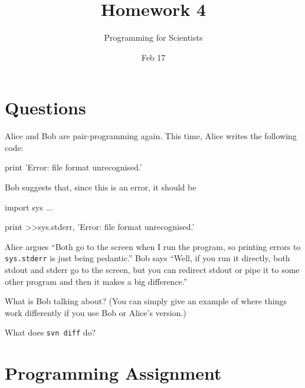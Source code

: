 
\author{Programming for Scientists}
\title{Homework 4}
\date{Feb 17}

\maketitle

\chapter{Questions}

\question %
Alice and Bob are pair-programming again. This time, Alice writes the following code:

\begin{python}
print 'Error: file format unrecognised.'
\end{python}

Bob suggests that, since this is an error, it should be 

\begin{python}
import sys
...

print >>sys.stderr, 'Error: file format unrecognised.'
\end{python}

Alice argues ``Both go to the screen when I run the program, so printing errors to \lstinline{sys.stderr} is just being pedantic.'' Bob says ``Well, if you run it directly, both stdout and stderr go to the screen, but you can redirect stdout or pipe it to some other program and then it makes a big difference.''

What is Bob talking about? (You can simply give an example of where things work differently if you use Bob or Alice's version.)

\question %

\question %

\question %

\question %
What does \texttt{svn diff} do?

\chapter{Programming Assignment}


